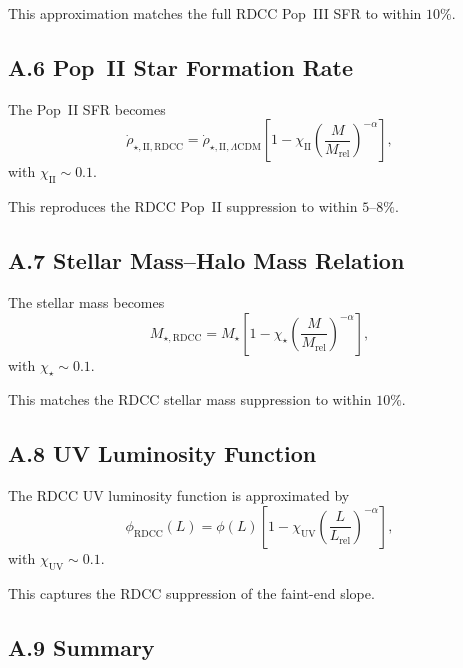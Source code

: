 \documentclass[11pt,a4paper]{article}
\begin{document}
This approximation matches the full RDCC Pop~III SFR to within $10\%$.

\subsection*{A.6 Pop~II Star Formation Rate}

The Pop~II SFR becomes
\begin{equation}
    \dot{\rho}_{\star,\mathrm{II,RDCC}}
    = \dot{\rho}_{\star,\mathrm{II},\Lambda\mathrm{CDM}}
      \left[
        1 - \chi_{\mathrm{II}}
        \left(\frac{M}{M_{\mathrm{rel}}}\right)^{-\alpha}
      \right],
\end{equation}
with $\chi_{\mathrm{II}} \sim 0.1$.

This reproduces the RDCC Pop~II suppression to within $5$–$8\%$.

\subsection*{A.7 Stellar Mass–Halo Mass Relation}

The stellar mass becomes
\begin{equation}
    M_{\star,\mathrm{RDCC}}
    = M_{\star}
      \left[
        1 - \chi_{\star}
        \left(\frac{M}{M_{\mathrm{rel}}}\right)^{-\alpha}
      \right],
\end{equation}
with $\chi_{\star} \sim 0.1$.

This matches the RDCC stellar mass suppression to within $10\%$.

\subsection*{A.8 UV Luminosity Function}

The RDCC UV luminosity function is approximated by
\begin{equation}
    \phi_{\mathrm{RDCC}}(L)
    = \phi(L)
      \left[
        1 - \chi_{\mathrm{UV}}
        \left(\frac{L}{L_{\mathrm{rel}}}\right)^{-\alpha}
      \right],
\end{equation}
with $\chi_{\mathrm{UV}} \sim 0.1$.

This captures the RDCC suppression of the faint-end slope.

\subsection*{A.9 Summary}
\end{document}
